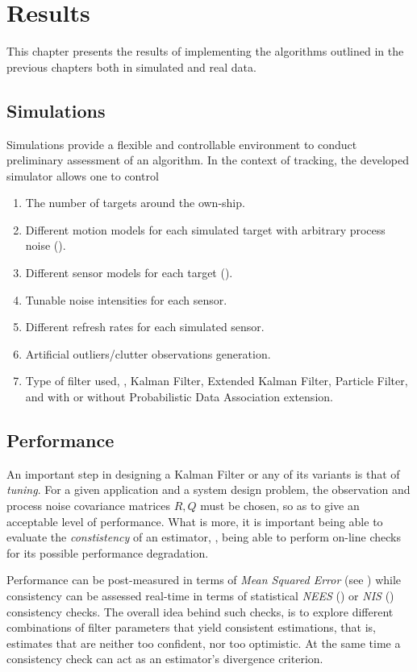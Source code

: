 \chapter{Results}\label{ch:Results}
This chapter presents the results of implementing the algorithms outlined in the previous chapters both in simulated and real data.

\section{Simulations}
Simulations provide a flexible and controllable environment to conduct preliminary assessment of an algorithm. In the context of tracking, the developed simulator allows one to control 
\begin{enumerate}[label=(\alph*)] 
	\item The number of targets around the own-ship.
	\item Different motion models for each simulated target with arbitrary process noise ().
	\item Different sensor models for each target ().
	\item Tunable noise intensities for each sensor.
	\item Different refresh rates for each simulated sensor.
	\item Artificial outliers/clutter observations generation.
	\item Type of filter used, \ie, Kalman Filter, Extended Kalman Filter, Particle Filter, and with or without Probabilistic Data Association extension.
\end{enumerate}

\section{Performance} \label{sec:performance}


An important step in designing a Kalman Filter or any of its variants is that of \emph{tuning}. For a given application and a system design problem, the observation and process noise covariance matrices $R,Q$ must be chosen, so as to give an acceptable level of performance. What is more, it is important being able to evaluate the \emph{constistency} of an estimator, \ie, being able to perform on-line checks for its possible performance degradation. 

Performance can be post-measured in terms of \emph{Mean Squared Error} (see ) while consistency can be assessed real-time in terms of statistical \emph{NEES} () or \emph{NIS} () consistency checks. The overall idea behind such checks, is to explore different combinations of filter parameters that yield consistent estimations, that is, estimates that are neither too confident, nor too optimistic. At the same time a consistency check can act as an estimator's divergence criterion.

